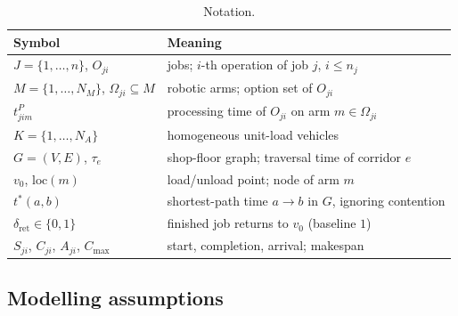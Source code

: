 \documentclass[manuscript,screen,review]{acmart}
\begin{document}
\begin{table}[t]
\caption{Notation.}
\label{tab:notation}
\footnotesize
\renewcommand{\arraystretch}{0.95}
\begin{tabular}{@{}ll@{}}
\toprule
Symbol & Meaning \\
\midrule
$J=\{1,\dots,n\}$, $O_{ji}$ & jobs; $i$-th operation of job $j$, $i\le n_j$ \\
$M=\{1,\dots,N_M\}$, $\Omega_{ji}\subseteq M$ & robotic arms; option set of $O_{ji}$ \\
$t^P_{jim}$ & processing time of $O_{ji}$ on arm $m\in\Omega_{ji}$ \\
$K=\{1,\dots,N_A\}$ & homogeneous unit-load vehicles \\
$G=(V,E)$, $\tau_e$ & shop-floor graph; traversal time of corridor $e$ \\
$v_0$, $\mathrm{loc}(m)$ & load/unload point; node of arm $m$ \\
$t^{*}(a,b)$ & shortest-path time $a\to b$ in $G$, ignoring contention \\
$\delta_{\mathrm{ret}}\in\{0,1\}$ & finished job returns to $v_0$ (baseline $1$) \\
$S_{ji}$, $C_{ji}$, $A_{ji}$, $C_{\max}$ & start, completion, arrival; makespan \\
\bottomrule
\end{tabular}
\end{table}

\subsection{Modelling assumptions}
\label{sec:assumptions}
\end{document}
